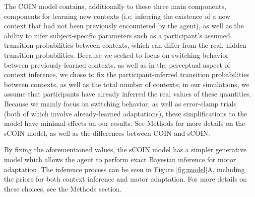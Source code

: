 \documentclass[a4paper,doc,floatsintext,natbib]{apa6}
\def \fref #1{Figure \ref{#1}}     %
\begin{document}
The COIN model contains, additionally to these three main components, components for learning new contexts (i.e. inferring the existence of a new context that had not been previously encountered by the agent), as well as the ability to infer subject-specific parameters such as a participant's assumed transition probabilities between contexts, which can differ from the real, hidden transition probabilities. Because we seeked to focus on switching behavior between previously-learned contexts, as well as in the perceptual aspect of context inference, we chose to fix the participant-inferred transition probabilities between contexts, as well as the total number of contexts; in our simulations, we assume that participants have already inferred the real values of these quantities. Because we mainly focus on switching behavior, as well as error-clamp trials (both of which involve already-learned adaptations), these simplifications to the model have minimal effects on our results. See Methods for more details on the sCOIN model, as well as the differences between COIN and sCOIN.

By fixing the aforementioned values, the sCOIN model has a simpler generative model which allows the agent to perform exact Bayesian inference for motor adaptation. The inference process can be seen in \fref{fig:model}A, including the priors for both context inference and motor adaptation. For more details on these choices, see the Methods section.
\end{document}
